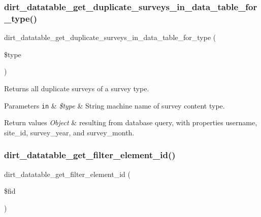 \subsubsection{\texorpdfstring{dirt\+\_\+datatable\+\_\+get\+\_\+duplicate\+\_\+surveys\+\_\+in\+\_\+data\+\_\+table\+\_\+for\+\_\+type()}{dirt\_datatable\_get\_duplicate\_surveys\_in\_data\_table\_for\_type()}}
{\footnotesize\ttfamily dirt\+\_\+datatable\+\_\+get\+\_\+duplicate\+\_\+surveys\+\_\+in\+\_\+data\+\_\+table\+\_\+for\+\_\+type (\begin{DoxyParamCaption}\item[{}]{\$type }\end{DoxyParamCaption})}

Returns all duplicate surveys of a survey type.


\begin{DoxyParams}[1]{Parameters}
\mbox{\tt in}  & {\em \$type} & String machine name of survey content type.\\
\hline
\end{DoxyParams}

\begin{DoxyRetVals}{Return values}
{\em Object} & resulting from database query, with properties \textquotesingle{}username\textquotesingle{}, \textquotesingle{}site\+\_\+id\textquotesingle{}, \textquotesingle{}survey\+\_\+year\textquotesingle{}, and \textquotesingle{}survey\+\_\+month\textquotesingle{}. \\
\hline
\end{DoxyRetVals}
\mbox{\label{dirt__datatable_8search__table__db__ops_8inc_affbfc59ee68da952a55a0efbfe961866}} 
\subsubsection{\texorpdfstring{dirt\+\_\+datatable\+\_\+get\+\_\+filter\+\_\+element\+\_\+id()}{dirt\_datatable\_get\_filter\_element\_id()}}
{\footnotesize\ttfamily dirt\+\_\+datatable\+\_\+get\+\_\+filter\+\_\+element\+\_\+id (\begin{DoxyParamCaption}\item[{}]{\$fid }\end{DoxyParamCaption})}

